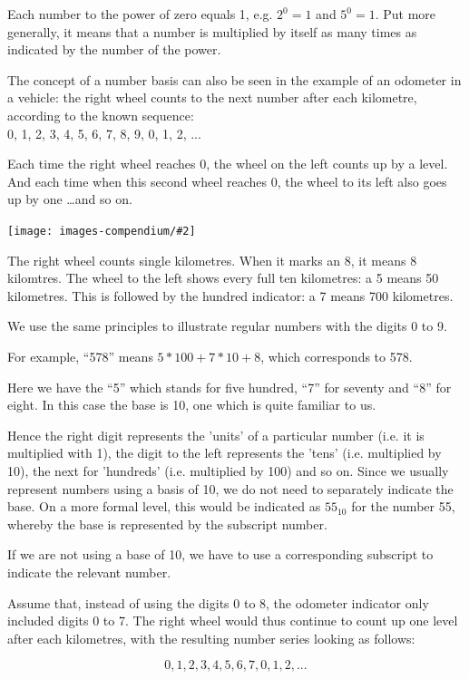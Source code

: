 \documentclass[a4paper,11pt,oneside,openright,titlepage]{scrbook}
\newcommand{\IncludeImage}[2][]{
\begin{center}
  \texttt{[image: images-compendium/\#2]}%
\end{center}
}
\begin{document}
Each number to the power of zero equals 1, e.g. $2^0 = 1$ and $5^0 = 1$.
Put more generally, it means that a number is multiplied by itself as
many times as indicated by the number of the power.

The concept of a number basis can also be seen in the example of an
odometer in a vehicle: the right wheel counts to the next number after
each kilometre, according to the known sequence:\\
0, 1, 2, 3, 4, 5, 6, 7, 8, 9, 0, 1, 2, ...

Each time the right wheel reaches 0, the wheel on the left counts up
by a level. And each time when this second wheel reaches 0, the wheel
to its left also goes up by one \ldots and so on.


\IncludeImage[width=0.4\textwidth]{mileage-indicator}

The right wheel counts single kilometres. When it marks an 8, it means
8 kilomtres. The wheel to the left shows every full ten kilometres: a
5 means 50 kilometres. This is followed by the hundred indicator: a 7
means 700 kilometres.

We use the same principles to illustrate regular numbers with the
digits 0 to 9.

For example, ``578'' means $5 * 100 + 7 * 10 + 8$, which corresponds
to 578.

Here we have the ``5'' which stands for five hundred,  ``7'' for
seventy and ``8'' for eight. In this case the base is 10, one which is
quite familiar to us.

Hence the right digit represents the 'units' of a particular number
(i.e. it is multiplied with 1), the digit to the left represents the
'tens' (i.e. multiplied by 10), the next for 'hundreds' (i.e.
multiplied by 100) and so on. Since we usually represent numbers using
a basis of 10, we do not need to separately indicate the base. On a
more formal level, this would be indicated as  $55_{10}$ for the
number 55, whereby the base is represented by the subscript number.

If we are not using a base of 10, we have to use a corresponding
subscript to indicate the relevant number.

Assume that, instead of using the digits 0 to 8, the odometer
indicator only included digits 0 to 7. The right wheel would thus
continue to count up one level after each kilometres, with the
resulting number series looking as follows:


\[ 0, 1, 2, 3, 4, 5, 6, 7, 0, 1, 2, ... \]
\end{document}
